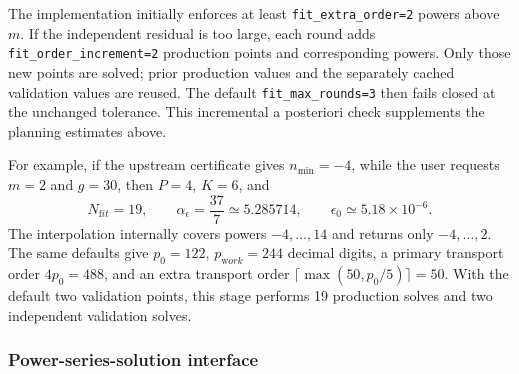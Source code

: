 \documentclass[11pt]{article}
\newcommand{\eps}{\epsilon}
\begin{document}
The implementation initially enforces at least
\texttt{fit\_extra\_order=2} powers above $m$.  If the independent residual is too large,
each round adds \texttt{fit\_order\_increment=2} production points and corresponding powers.
Only those new points are solved; prior production values and the separately cached validation
values are reused.  The default \texttt{fit\_max\_rounds=3} then fails closed at the unchanged
tolerance.  This incremental a posteriori check supplements the planning estimates above.

For example, if the upstream certificate gives $n_{\min}=-4$, while the user requests
$m=2$ and $g=30$, then $P=4$, $K=6$, and
\begin{equation}
 N_{\mathrm fit}=19,\qquad
 \alpha_\eps=\frac{37}{7}\simeq5.285714,
 \qquad \eps_0\simeq5.18\times10^{-6}.
\end{equation}
The interpolation internally covers powers $-4,\ldots,14$ and returns only
$-4,\ldots,2$.  The same defaults give $p_0=122$, $p_{\mathrm work}=244$ decimal
digits, a primary transport order $4p_0=488$, and an extra transport order
$\lceil\max(50,p_0/5)\rceil=50$.  With the default two validation points, this stage performs
19 production solves and two independent validation solves.

\subsubsection{Power-series-solution interface}
\end{document}
